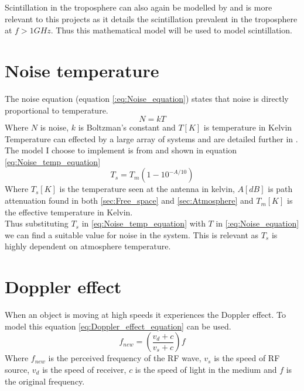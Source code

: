 \documentclass[conference]{IEEEtran}
\begin{document}
Scintillation in the troposphere can also again be modelled by \cite{ITU-R_P.618-7} and is more relevant to this projects as it details the scintillation prevalent in the troposphere at $f > 1G Hz$. Thus this mathematical model will be used to model scintillation.


\label{sec:Scintillation}

\section{Noise temperature}
The noise equation (equation \ref{:eq:Noise_equation}) states that noise is directly proportional to temperature. 
\begin{equation}
N = kT
\label{:eq:Noise_equation}
\end{equation}
Where $N$ is noise, $k$ is Boltzman's constant and $T[K]$ is temperature in Kelvin\\

Temperature can effected by a large array of systems and are detailed further in \cite{ITU-R_P.372-16}. The model I choose to implement is from \cite{ITU-R_P.618-7} and shown in equation \ref{eq:Noise_temp_equation}
\begin{equation}
T_s = T_m(1-10^{-A/10})
\label{eq:Noise_temp_equation}
\end{equation}
Where $T_s[K]$ is the temperature seen at the antenna in kelvin, $A[dB]$ is path attenuation found in both \ref{sec:Free_space} and \ref{sec:Atmosphere} and $T_m [K]$ is the effective temperature in Kelvin.\\

Thus substituting $T_s$ in \ref{eq:Noise_temp_equation} with $T$ in \ref{:eq:Noise_equation} we can find a suitable value for noise in the system. This is relevant as $T_s$ is highly dependent on atmosphere temperature. 

\label{sec:Noise_temp}


\section{Doppler effect}
When an object is moving at high speeds it experiences the Doppler effect. To model this equation \ref{eq:Doppler_effect_equation} can be used. 
\begin{equation}
f_{new} =(\frac{v_d+c}{v_s+c})f
\label{eq:Doppler_effect_equation}
\end{equation}
Where $f_{new}$ is the perceived frequency of the RF wave, $v_s$ is the speed of RF source, $v_d$ is the speed of receiver, $c$ is the speed of light in the medium and $f$ is the original frequency.\\
\end{document}
